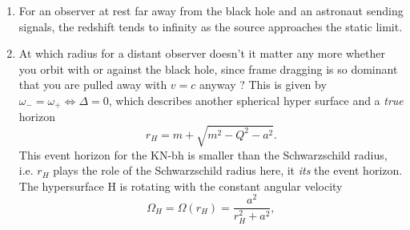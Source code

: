 \begin{enumerate}
	on a radial orbit have an angular
	velocity ? It has by the frame drag of the black hole.
	\begin{mybox}{Static limit in the Kerr spacetime}
		The minimum angular velocity $\omega_-$ vanishes if and only if
		$g_{tt} = \langle k, k \rangle = 0$, i.e. if the Killing vector field $k$ turns light-like.
		From the metric component, this is equivalent to
		\begin{equation}
			g_{tt} = 0 \; \Rightarrow \; r_0 = m + \sqrt{m^2 - Q^2 -a^2 \cos^2\vartheta}.
		\end{equation}
		The radius $r_0$ marks the static limit of Kerr space-time: for an observer
		at this radius to remain static with respect to observers at infinity
		(i.e. with respect to the “fixed stars”), she would have to move with the
		speed of light. At smaller radii, observers cannot remain static against
		the drag of the rotating black hole.
		If you get close, even if $u=c$ against the drag of the black hole, you will be seen from outside as falling onto black hole.\\
		The hypersurface defined by the static limit is time-like, which means that
		it can be crossed in both directions, in contrast to the event horizon, which can only be crossed
		to the inside. The region in between the static limit and the event horizon is the ergosphere, in
		which no observer can be prevented from following the rotation of the black hole.
	\end{mybox}
	 	\item For an observer at rest far away from the black hole and an astronaut sending signals, the redshift tends to infinity as the source approaches the static limit.
	 	\item At which radius for a distant observer doesn't it matter any more whether you orbit with or against the black hole, since frame dragging is so dominant that you are pulled away with $v=c$ anyway ? This is given by $\omega_- = \omega_+ \Leftrightarrow \Delta=0$, which describes another spherical hyper surface and a \emph{true} horizon
	 \begin{equation}
	 	r_H = m + \sqrt{m^2-Q^2- a^2}.
	 \end{equation}
	 This event horizon for the KN-bh is smaller than the Schwarzschild radius, i.e. $r_H$ plays the role of the Schwarzschild radius here, it \emph{its} the event horizon.
	 The hypersurface H is rotating with the constant angular velocity
	 \begin{equation}
	 	\Omega_H = \Omega(r_H) = \frac{a^2}{r^2_H+a^2},

\end{equation}
\end{enumerate}
